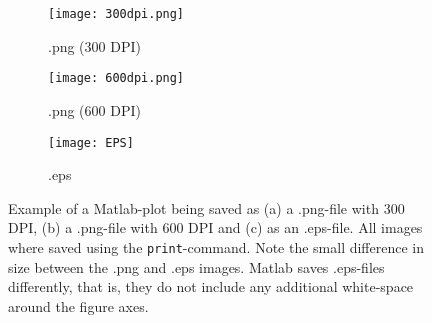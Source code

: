 \documentclass[fleqn,10pt]{SelfArx} %
\begin{document}
\newpage %
\begin{figure}[ht!]
\centering
    \begin{subfigure}[t]{\columnwidth} %
        \centering
        \texttt{[image: 300dpi.png]} 
        \caption{.png (300 DPI)}
        \label{fig:300dpi}
    \end{subfigure}
    
    \begin{subfigure}[c]{\columnwidth} %
        \centering
        \texttt{[image: 600dpi.png]} 
        \caption{.png (600 DPI)}
        \label{fig:600dpi}
    \end{subfigure}
    
    
    \begin{subfigure}[b]{\columnwidth} %
        \centering
        \texttt{[image: EPS]}
        \caption{.eps}
        \label{fig:eps}
    \end{subfigure}
    
\caption{Example of a Matlab-plot being saved as (a) a .png-file with 300 DPI, (b) a .png-file with 600 DPI and (c) as an .eps-file. All images where saved using the \texttt{print}-command. Note the small difference in size between the .png and .eps images. Matlab saves .eps-files differently, that is, they do not include any additional white-space around the figure axes.}
\label{fig:matlabplots}
\end{figure}
\end{document}
